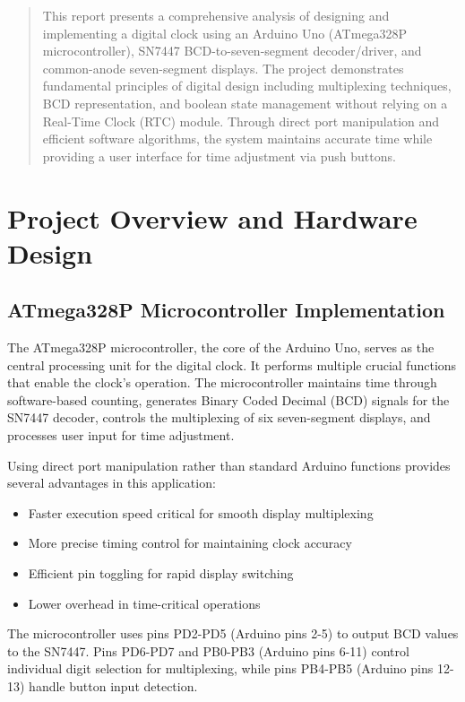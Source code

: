 \documentclass{article}
\begin{document}
\begin{abstract}
This report presents a comprehensive analysis of designing and implementing a digital clock using an Arduino Uno (ATmega328P microcontroller), SN7447 BCD-to-seven-segment decoder/driver, and common-anode seven-segment displays. The project demonstrates fundamental principles of digital design including multiplexing techniques, BCD representation, and boolean state management without relying on a Real-Time Clock (RTC) module. Through direct port manipulation and efficient software algorithms, the system maintains accurate time while providing a user interface for time adjustment via push buttons.
\end{abstract}

\section{Project Overview and Hardware Design}

\subsection{ATmega328P Microcontroller Implementation}
The ATmega328P microcontroller, the core of the Arduino Uno, serves as the central processing unit for the digital clock. It performs multiple crucial functions that enable the clock's operation. The microcontroller maintains time through software-based counting, generates Binary Coded Decimal (BCD) signals for the SN7447 decoder, controls the multiplexing of six seven-segment displays, and processes user input for time adjustment.

Using direct port manipulation rather than standard Arduino functions provides several advantages in this application:
\begin{itemize}
\item Faster execution speed critical for smooth display multiplexing
\item More precise timing control for maintaining clock accuracy
\item Efficient pin toggling for rapid display switching
\item Lower overhead in time-critical operations
\end{itemize}

The microcontroller uses pins PD2-PD5 (Arduino pins 2-5) to output BCD values to the SN7447. Pins PD6-PD7 and PB0-PB3 (Arduino pins 6-11) control individual digit selection for multiplexing, while pins PB4-PB5 (Arduino pins 12-13) handle button input detection.
\end{document}

